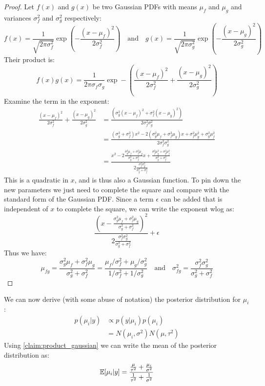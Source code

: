 \documentclass[DIV=14,titlepage=false]{scrreprt}
\begin{document}
\begin{proof}
    Let $f(x)$ and $g(x)$ be two Gaussian PDFs with means $\mu_f$ and $\mu_g$ and variances $\sigma^2_f$ and $\sigma^2_g$ respectively:
    \[
        f(x) = \frac{1}{\sqrt{2\pi \sigma^2_f}}\exp\left(-\frac{(x-\mu_f)^2}{2\sigma^2_f}\right) \quad \text{and} \quad g(x) = \frac{1}{\sqrt{2\pi \sigma^2_g}}\exp\left(-\frac{(x-\mu_g)^2}{2\sigma^2_g}\right)
    \]
    Their product is:
    \[
        f(x)g(x) = \frac{1}{2\pi \sigma_f \sigma_g}\exp-\left(\frac{(x-\mu_f)^2}{2\sigma^2_f} + \frac{(x-\mu_g)^2}{2\sigma^2_g}\right)
    \]
    Examine the term in the exponent:
    \begin{align*}
        \frac{(x-\mu_f)^2}{2\sigma^2_f} + \frac{(x-\mu_g)^2}{2\sigma^2_g} &= \frac{(\sigma^2_g(x-\mu_f)^2 + \sigma^2_f(x-\mu_g)^2)}{2\sigma^2_f\sigma^2_g}\\
        &= \frac{(\sigma^2_g + \sigma^2_f)x^2 - 2(\sigma^2_g\mu_f + \sigma^2_f\mu_g)x + \sigma^2_f\mu_g^2 + \sigma^2_g\mu_f^2}{2\sigma^2_f\sigma^2_g}\\
        &= \frac{x^2 - 2\frac{\sigma^2_g\mu_f + \sigma^2_f\mu_g}{\sigma^2_g + \sigma^2_f}x + \frac{\sigma^2_f\mu_g^2 + \sigma^2_g\mu_f^2}{\sigma^2_g + \sigma^2_f}}{2\frac{\sigma^2_f\sigma^2_g}{\sigma^2_g + \sigma^2_f}}
    \end{align*}
    This is a quadratic in $x$, and is thus also a Gaussian function. To pin down the new parameters we just need to complete the square and compare with the standard form of the Gaussian PDF. Since a term $\epsilon$ can be added that is independent of $x$ to complete the square, we can write the exponent wlog as:
    \[
        \frac{\left(x-\frac{\sigma^2_g\mu_f + \sigma^2_f\mu_g}{\sigma^2_g + \sigma^2_f}\right)^2}{2\frac{\sigma^2_f\sigma^2_g}{\sigma^2_g + \sigma^2_f}} + \epsilon
    \]
    Thus we have:
    \[
        \mu_{fg} = \frac{\sigma^2_g\mu_f + \sigma^2_f\mu_g}{\sigma^2_g + \sigma^2_f} = \frac{\mu_f/\sigma^2_f + \mu_g/\sigma^2_g}{1/\sigma^2_f + 1/\sigma^2_g} \quad \text{and} \quad \sigma^2_{fg} = \frac{\sigma^2_f\sigma^2_g}{\sigma^2_g + \sigma^2_f}
    \]
\end{proof}
We can now derive (with some abuse of notation) the posterior distribution for $\mu_i$:
\begin{align*}
    p(\mu_i|y) & \propto p(y|\mu_i)p(\mu_i)\\
    &= N(\mu_i, \sigma^2)N(\mu, \tau^2)
    \end{align*}
Using \ref{claim:product_gaussian} we can write the mean of the posterior distribution as:
\[
    \mathbb{E}[\mu_i|y] = \frac{\frac{\mu}{\tau^2} + \frac{\mu_i}{\sigma^2}}{\frac{1}{\tau^2} + \frac{1}{\sigma^2}} 
\]
\end{document}
